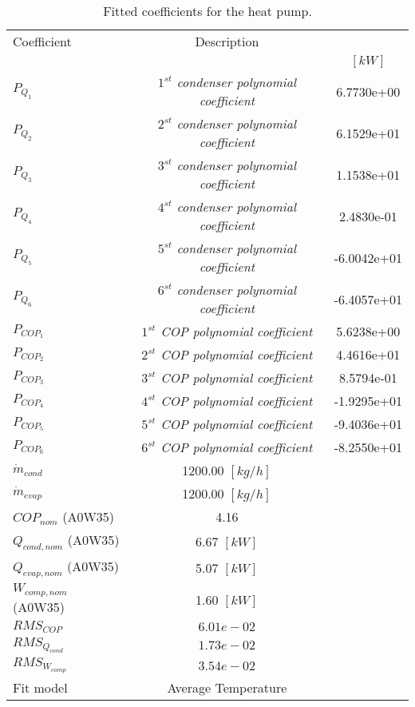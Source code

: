 \documentclass[english]{SPFShortReport}
\author{Dani Carbonell}
\begin{document}
\begin{table}[!ht]
\begin{small}
\caption{Fitted coefficients for the heat pump.}
\begin{center}
\resizebox{12cm}{!} 
{
\begin{tabular}{l | c c } 
\hline
\hline
Coefficient &Description & \\ 
 & &$[kW]$\\ 
\hline
$P_{Q_{1}}$ & \emph{$1^{st}$ condenser polynomial coefficient}  & 6.7730e+00    \\ 
$P_{Q_{2}}$ & \emph{$2^{st}$ condenser polynomial coefficient}  & 6.1529e+01    \\ 
$P_{Q_{3}}$ & \emph{$3^{st}$ condenser polynomial coefficient}  & 1.1538e+01    \\ 
$P_{Q_{4}}$ & \emph{$4^{st}$ condenser polynomial coefficient}  & 2.4830e-01    \\ 
$P_{Q_{5}}$ & \emph{$5^{st}$ condenser polynomial coefficient}  & -6.0042e+01    \\ 
$P_{Q_{6}}$ & \emph{$6^{st}$ condenser polynomial coefficient}  & -6.4057e+01    \\ 
\hline
$P_{COP_{1}}$ & \emph{$1^{st}$ COP polynomial coefficient}  & 5.6238e+00    \\ 
$P_{COP_{2}}$ & \emph{$2^{st}$ COP polynomial coefficient}  & 4.4616e+01    \\ 
$P_{COP_{3}}$ & \emph{$3^{st}$ COP polynomial coefficient}  & 8.5794e-01    \\ 
$P_{COP_{4}}$ & \emph{$4^{st}$ COP polynomial coefficient}  & -1.9295e+01    \\ 
$P_{COP_{5}}$ & \emph{$5^{st}$ COP polynomial coefficient}  & -9.4036e+01    \\ 
$P_{COP_{6}}$ & \emph{$6^{st}$ COP polynomial coefficient}  & -8.2550e+01    \\ 
\hline
$\dot m_{cond}$ & 1200.00 $[kg/h]$ \\ 
$\dot m_{evap}$ & 1200.00 $[kg/h]$ \\ 
\hline
$COP_{nom}$ (A0W35)& 4.16 \\ 
$Q_{cond,nom}$ (A0W35)& 6.67 $[kW]$\\ 
$Q_{evap,nom}$ (A0W35)& 5.07 $[kW]$\\ 
$W_{comp,nom}$ (A0W35)& 1.60 $[kW]$\\ 
\hline
 $RMS_{COP}$ & $6.01e-02$ \\ 
 $RMS_{Q_{cond}}$ & $1.73e-02$ \\ 
 $RMS_{W_{comp}}$ & $3.54e-02$ \\ 
\hline
Fit model & Average Temperature\\ 
\hline
\hline
\end{tabular}
}
\label{CoefTable}
\end{center}
\end{small}
\end{table}
\end{document}
